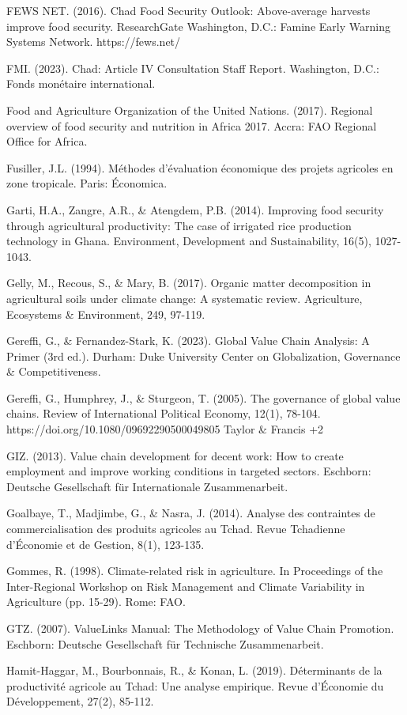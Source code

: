 \documentclass[12pt,oneside]{report}
\begin{document}
FEWS NET. (2016). Chad Food Security Outlook: Above-average harvests improve food security. ResearchGate Washington, D.C.: Famine Early Warning Systems Network. https://fews.net/

FMI. (2023). Chad: Article IV Consultation Staff Report. Washington, D.C.: Fonds monétaire international.

Food and Agriculture Organization of the United Nations. (2017). Regional overview of food security and nutrition in Africa 2017. Accra: FAO Regional Office for Africa.

Fusiller, J.L. (1994). Méthodes d'évaluation économique des projets agricoles en zone tropicale. Paris: Économica.

Garti, H.A., Zangre, A.R., \& Atengdem, P.B. (2014). Improving food security through agricultural productivity: The case of irrigated rice production technology in Ghana. Environment, Development and Sustainability, 16(5), 1027-1043.

Gelly, M., Recous, S., \& Mary, B. (2017). Organic matter decomposition in agricultural soils under climate change: A systematic review. Agriculture, Ecosystems \& Environment, 249, 97-119.

Gereffi, G., \& Fernandez-Stark, K. (2023). Global Value Chain Analysis: A Primer (3rd ed.). Durham: Duke University Center on Globalization, Governance \& Competitiveness.

Gereffi, G., Humphrey, J., \& Sturgeon, T. (2005). The governance of global value chains. Review of International Political Economy, 12(1), 78-104. https://doi.org/10.1080/09692290500049805 Taylor \& Francis +2

GIZ. (2013). Value chain development for decent work: How to create employment and improve working conditions in targeted sectors. Eschborn: Deutsche Gesellschaft für Internationale Zusammenarbeit.

Goalbaye, T., Madjimbe, G., \& Nasra, J. (2014). Analyse des contraintes de commercialisation des produits agricoles au Tchad. Revue Tchadienne d'Économie et de Gestion, 8(1), 123-135.

Gommes, R. (1998). Climate-related risk in agriculture. In Proceedings of the Inter-Regional Workshop on Risk Management and Climate Variability in Agriculture (pp. 15-29). Rome: FAO.

GTZ. (2007). ValueLinks Manual: The Methodology of Value Chain Promotion. Eschborn: Deutsche Gesellschaft für Technische Zusammenarbeit.

Hamit-Haggar, M., Bourbonnais, R., \& Konan, L. (2019). Déterminants de la productivité agricole au Tchad: Une analyse empirique. Revue d'Économie du Développement, 27(2), 85-112.
\end{document}
